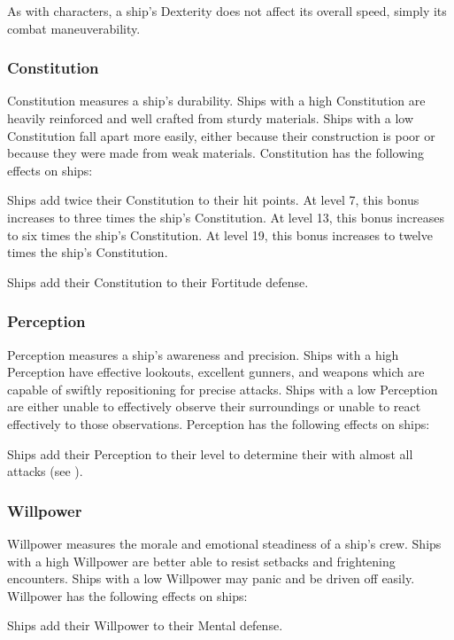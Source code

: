         As with characters, a ship's Dexterity does not affect its overall speed, simply its combat maneuverability.

    \subsubsection{Constitution}
        Constitution measures a ship's durability.
        Ships with a high Constitution are heavily reinforced and well crafted from sturdy materials.
        Ships with a low Constitution fall apart more easily, either because their construction is poor or because they were made from weak materials.
        Constitution has the following effects on ships:
        \begin{raggeditemize}
            \item Ships add twice their Constitution to their hit points.
                At level 7, this bonus increases to three times the ship's Constitution.
                At level 13, this bonus increases to six times the ship's Constitution.
                At level 19, this bonus increases to twelve times the ship's Constitution.
            \item Ships add their Constitution to their Fortitude defense.
        \end{raggeditemize}

    \subsubsection{Perception}
        Perception measures a ship's awareness and precision.
        Ships with a high Perception have effective lookouts, excellent gunners, and weapons which are capable of swiftly repositioning for precise attacks.
        Ships with a low Perception are either unable to effectively observe their surroundings or unable to react effectively to those observations.
        Perception has the following effects on ships:
        \begin{raggeditemize}
            \item Ships add their Perception to their level to determine their  with almost all attacks (see ).
        \end{raggeditemize}

    \subsubsection{Willpower}
        Willpower measures the morale and emotional steadiness of a ship's crew.
        Ships with a high Willpower are better able to resist setbacks and frightening encounters.
        Ships with a low Willpower may panic and be driven off easily.
        Willpower has the following effects on ships:
        \begin{raggeditemize}
            \item Ships add their Willpower to their Mental defense.
        \end{raggeditemize}

